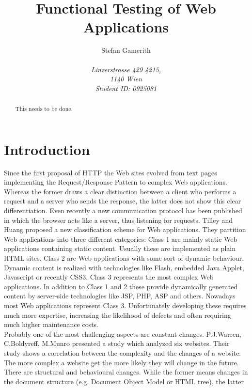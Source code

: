 \documentclass[12pt, notitlepage]{article}
\title{Functional Testing of Web Applications}
\author{Stefan Gamerith\\\\
		\emph{Linzerstrasse 429 4215,}\\
		\emph{1140 Wien}\\
		\emph{Student ID: 0925081}}
\begin{document}
	\maketitle
	\thispagestyle{empty}
	\begin{abstract}
		This needs to be done.
	\end{abstract}
	\newpage
	\onehalfspacing
	\tableofcontents
	\thispagestyle{empty}
	\singlespacing
\newpage
\setcounter{page}{1}

\section*{Introduction}
Since the first proposal of HTTP\cite{http-proposal} the Web sites evolved from 
text pages implementing the Request/Response Pattern\cite{request-response}  to  
complex Web applications. Whereas the former draws a clear distinction between a client
who performs a request and a server who sends the response, the latter does not show this 
clear differentiation. Even recently a new communication protocol\cite{web-socket} has been published 
in which the browser acts like a server, thus listening for requests. Tilley and Huang \cite{web-classification} proposed
a new classification scheme for Web applications. They partition Web applications into three different categories:
Class 1 are mainly static Web applications containing static content. Usually these are implemented as plain HTML sites. 
Class 2 are Web applications with some sort of dynamic behaviour. Dynamic content is realized with technologies like Flash\cite{flash},
embedded Java Applet\cite{java-applet}, Javascript or recently CSS3\cite{css3}. 
Class 3 represents the most complex Web applications. In addition to Class 1 and 2 these provide dynamically generated content by server-side technologies
like JSP, PHP, ASP and others. Nowadays most Web applications represent Class 3. Unfortunately developing these requires much more expertise, increasing the
likelihood of defects and often requiring much higher maintenance costs.\\
Probably one of the most challenging aspects are constant changes. P.J.Warren, C.Boldyreff, M.Munro\cite{html-evolution}
presented a study which analyzed six websites. Their study shows a correlation between the complexity and the changes of
a website: The more complex a website get the more likely they will change in the future. 
There are structural and behavioural changes. While the former means changes in the document structure (e.g. Document Object Model\cite{dom} or HTML tree), the latter
\end{document}
